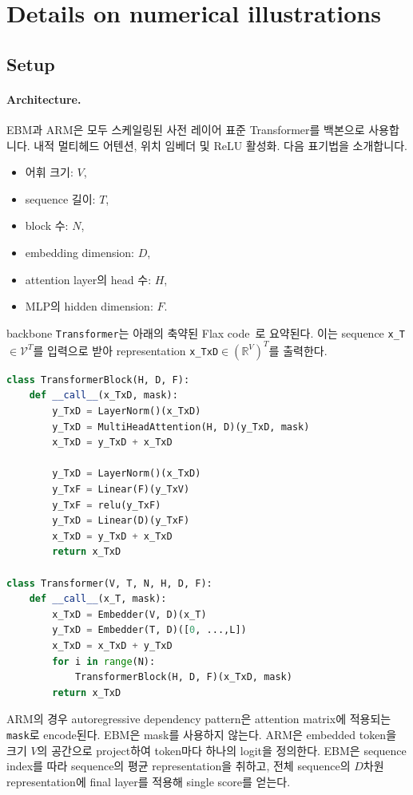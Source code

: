 \documentclass{article}
\def\RR{{\mathbb{R}}}
\def\cV{{\mathcal{V}}}
\begin{document}
\section{Details on numerical illustrations} \label{app:exp_details}

\subsection{Setup}

\paragraph{Architecture.}

EBM과 ARM은 모두 스케일링된 사전 레이어 표준 Transformer를 백본으로 사용합니다.
내적 멀티헤드 어텐션, 위치 임베더 및 ReLU 활성화.
다음 표기법을 소개합니다.
\begin{itemize}[nosep]
    \item 어휘 크기: $V$,
    \item sequence 길이: $T$,
    \item block 수: $N$,
    \item embedding dimension: $D$,
    \item attention layer의 head 수: $H$,
    \item MLP의 hidden dimension: $F$.
\end{itemize}
backbone \texttt{Transformer}는 아래의 축약된 Flax
code~\citep{flax2020github}로 요약된다. 이는 sequence \texttt{x\_T}$\in \cV^T$를 입력으로 받아
representation \texttt{x\_TxD}$\in (\RR^V)^T$를 출력한다.

\begin{lstlisting}[language=Python]
class TransformerBlock(H, D, F):
    def __call__(x_TxD, mask):
        y_TxD = LayerNorm()(x_TxD)
        y_TxD = MultiHeadAttention(H, D)(y_TxD, mask)
        x_TxD = y_TxD + x_TxD
    
        y_TxD = LayerNorm()(x_TxD)
        y_TxF = Linear(F)(y_TxV)
        y_TxF = relu(y_TxF)
        y_TxD = Linear(D)(y_TxF)
        x_TxD = y_TxD + x_TxD
        return x_TxD

class Transformer(V, T, N, H, D, F):
    def __call__(x_T, mask):
        x_TxD = Embedder(V, D)(x_T)
        y_TxD = Embedder(T, D)([0, ...,L])
        x_TxD = x_TxD + y_TxD
        for i in range(N):
            TransformerBlock(H, D, F)(x_TxD, mask)
        return x_TxD
\end{lstlisting}
ARM의 경우 autoregressive dependency pattern은 attention matrix에 적용되는
\texttt{mask}로 encode된다. EBM은 mask를 사용하지 않는다.
ARM은 embedded token을 크기 $V$의 공간으로 project하여 token마다 하나의
logit을 정의한다. EBM은 sequence index를 따라 sequence의 평균 representation을 취하고,
전체 sequence의 $D$차원 representation에 final layer를 적용해 single score를 얻는다.
\end{document}
